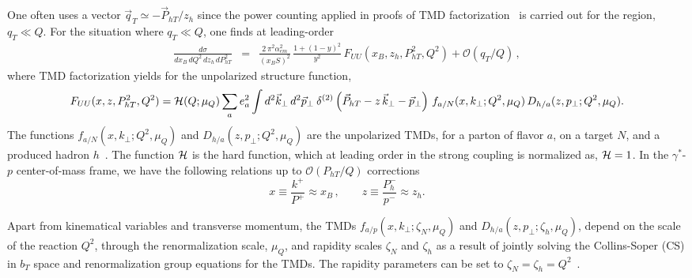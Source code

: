 \documentclass[final,3p,times,onecolumn,sort&compress,hidelinks]{elsarticle}
\newcommand{\xbj}{x_B}
\newcommand{\zh}{z_h}
\begin{document}
One often uses a vector $\vec{q}_T \simeq -\vec{P}_{hT}/\zh$
 since the power counting applied in proofs of  TMD factorization~\cite{Collins:2011zzd} is carried out for the region, $q_T \ll Q$.
For the situation where $q_{T}\ll Q$, one finds at leading-order~\cite{Bacchetta:2006tn}
\begin{eqnarray}
\frac{d\sigma}
{d\xbj\, dQ^2 \, d\zh \, dP_{hT}^2} &\!\!\!=\!\!\!&
\frac {2 \, \pi^2 \alpha_{em}^2}{(\xbj S)^2} \, \frac{ 1 + (1-y)^2 }{y^2}\,F_{UU}(\xbj,\zh,P_{hT}^2,Q^2) + \mathcal{O}(q_{T}/Q)\, ,
\label{e:dsigma}
\end{eqnarray}
where TMD factorization yields for the unpolarized structure function\cite{Collins:2011zzd},
\begin{equation}
F_{UU}(x,z,P_{hT}^2,Q^2)  = {\cal H} (Q; \mu_Q)\sum_{a} e_a^2 
\int d^2\vec{k}_\perp \, d^2\vec{p}_\perp
\> \delta ^{(2)}\left(\vec{P}_{hT} - z\,\vec{k}_\perp -\vec{p}_\perp \right)\,
f_{a/N} (x, k_{\perp}; Q^2, \mu_Q) \, D_{h/a}(z, p_{\perp}; Q^2, \mu_Q) .
\label{e:FUU} 
\end{equation}
The functions $f_{a/N} (x, k_{\perp}; Q^2, \mu_Q)$ and $D_{h/a}(z, p_{\perp}; Q^2, \mu_Q)$ are the unpolarized  TMDs,  for a parton of flavor
$a$, on a  target $N$, and a produced hadron $h$~\cite{Bacchetta:2006tn,Collins:2011zzd}.  The function ${\cal H}$ is the  hard function, which at leading order in the strong coupling
is normalized as, ${\cal H} = 1$.  In the $\gamma^*$-$p$ center-of-mass frame, we have the following relations up to $\mathcal{O}(P_{hT}/Q)$
corrections~\cite{Bacchetta:2006tn}
\begin{equation}
 x\equiv \frac{k^+}{P^+}\approx \xbj\,, \quad\quad z\equiv \frac{P_h^-}{p^-}\approx z_h.
  \label{e:LT_relations}
\end{equation}







 Apart from kinematical variables and transverse momentum, the TMDs  $f_{a/p} (x, k_{\perp}; \zeta_N, \mu_Q)$ and $D_{h/a}(z, p_{\perp}; \zeta_h, \mu_Q)$, 
depend on the scale of the reaction $Q^2$,  through  the renormalization scale, $\mu_Q$, and  rapidity scales  $\zeta_N$ and $\zeta_h$ as a result of  jointly solving the Collins-Soper (CS) in $b_T$ space  and renormalization group equations for the TMDs.  The rapidity parameters can be set to $\zeta_N=\zeta_h=Q^2$~\cite{Collins:2011zzd,Collins:2014jpa}.
\end{document}
